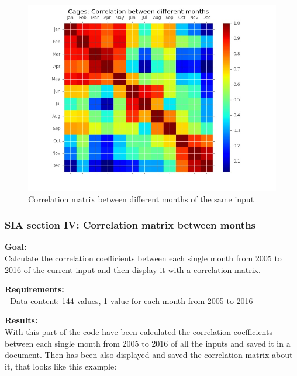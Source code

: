 \begin{figure}[H]
	\centering
    \includegraphics[width=1\textwidth]{Files/Cages_Months_Matrix.jpg}
    \caption{Correlation matrix between different months of the same input}
\end{figure}




\newpage
\subsubsection{SIA section IV: Correlation matrix between months}

\textbf{Goal:}\\
Calculate the correlation coefficients between each single month from 2005 to 2016 of the current input and then display it with a correlation matrix.

\textbf{Requirements:}\\
- Data content: 144 values, 1 value for each month from 2005 to 2016

\textbf{Results:} \\
With this part of the code have been calculated the correlation coefficients between each single month from 2005 to 2016 of all the inputs and saved it in a document. Then has been also displayed and saved the correlation matrix about it, that looks like this example:

